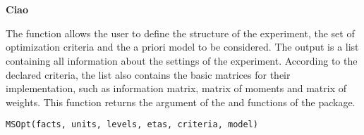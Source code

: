 \documentclass[a4paper]{book}
\begin{document}
\chapter*{}
\begin{center}
{\textbf{\huge Ciao}}
\par\bigskip{\large \today}
\end{center}
%
\begin{Description}\relax
The  function allows the user to define the
structure of the experiment, the set of optimization criteria and the a priori
model to be considered. The output is a list containing all information about
the settings of the experiment. According to the declared criteria, the list
also contains the basic matrices for their implementation, such as
information matrix, matrix of moments and matrix of weights. This function
returns the  argument of the  and
 functions of the  package.
\end{Description}
%
\begin{Usage}
\begin{verbatim}
MSOpt(facts, units, levels, etas, criteria, model)
\end{verbatim}
\end{Usage}
%
\end{document}
